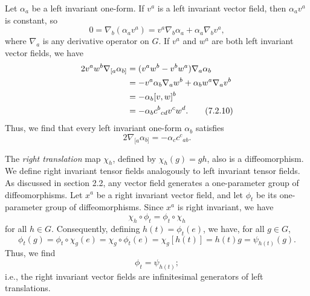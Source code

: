 Let \(\alpha_a\) be a left invariant one-form. If \(v^a\) is a left invariant vector
field, then \(\alpha_av^a\) is constant, so
\begin{equation}
  0=\nabla_b(\alpha_av^a)
   =v^a\nabla_b\alpha_a+\alpha_a\nabla_bv^a ,
  \tag{7.2.9}\label{eq:7.2.9}
\end{equation}
where \(\nabla_a\) is any derivative operator on \(G\). If \(v^a\) and \(w^a\)
are both left invariant vector fields, we have
\begin{align}
  2v^aw^b\nabla_{[a}\alpha_{b]}
    &=(v^aw^b-v^bw^a)\nabla_a\alpha_b \notag\\
    &=-v^a\alpha_b\nabla_aw^b+\alpha_bw^a\nabla_av^b \notag\\
    &=-\alpha_b[v,w]^b \notag\\
    &=-\alpha_bc^b{}_{cd}v^cw^d .
  \tag{7.2.10}\label{eq:7.2.10}
\end{align}
Thus, we find that every left invariant one-form \(\alpha_b\) satisfies
\begin{equation}
  2\nabla_{[a}\alpha_{b]}=-\alpha_cc^c{}_{ab} .
  \tag{7.2.11}\label{eq:7.2.11}
\end{equation}

The \emph{right translation} map \(\chi_h\), defined by
\(\chi_h(g)=gh\), also is a diffeomorphism. We define right invariant tensor
fields analogously to left invariant tensor fields. As discussed in section 2.2, any
vector field generates a one-parameter group of diffeomorphisms. Let \(x^a\) be a
right invariant vector field, and let \(\phi_t\) be its one-parameter group of
diffeomorphisms. Since \(x^a\) is right invariant, we have
\begin{equation}
  \chi_h\circ\phi_t=\phi_t\circ\chi_h
  \tag{7.2.12}\label{eq:7.2.12}
\end{equation}
for all \(h\in G\). Consequently, defining \(h(t)=\phi_t(e)\), we have, for all
\(g\in G\),
\begin{equation}
  \phi_t(g)=\phi_t\circ\chi_g(e)
    =\chi_g\circ\phi_t(e)
    =\chi_g[h(t)]
    =h(t)g
    =\psi_{h(t)}(g) .
  \tag{7.2.13}\label{eq:7.2.13}
\end{equation}
Thus, we find
\begin{equation}
  \phi_t=\psi_{h(t)} ;
  \tag{7.2.14}\label{eq:7.2.14}
\end{equation}
i.e., the right invariant vector fields are infinitesimal generators of left
translations.


